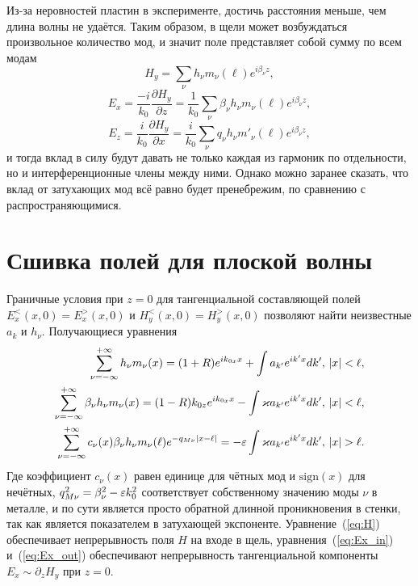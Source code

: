 Из-за неровностей пластин в эксперименте, достичь расстояния меньше, чем длина волны не удаётся. Таким образом, в щели может возбуждаться произвольное количество мод, и значит поле представляет собой сумму по всем модам 
\begin{equation*}
H_y = \sum_{\nu} h_\nu m_\nu(\ell) e^{i \beta_\nu z},
\end{equation*}
\begin{equation*}
E_x = \frac{-i}{k_0}\frac{\partial H_y}{\partial z} = \frac{1}{k_0}\sum_{\nu}\beta_\nu h_\nu m_\nu(\ell) e^{i \beta_\nu z},
\end{equation*}
\begin{equation*}
E_z = \frac{i}{k_0}\frac{\partial H_y}{\partial x} = \frac{i}{k_0}\sum_{\nu} q_\nu h_\nu  m'_\nu(\ell) e^{i \beta_\nu z},
\end{equation*}
и тогда вклад в силу будут давать не только каждая из гармоник по отдельности, но и интерференционные члены между ними. Однако можно заранее сказать, что вклад от затухающих мод всё равно будет пренебрежим, по сравнению с распространяющимися. 
\section{Сшивка полей для плоской волны}

 Граничные условия при $z = 0$ для тангенциальной составляющей полей $E_x^<(x,0) = E_x^>(x,0) $ и $H_y^<(x,0) = H_y^>(x,0)$ 
 позволяют найти неизвестные $a_k$ и $h_\nu$. Получающиеся уравнения
\begin{align}
\sum_{\nu = -\infty}^{+\infty} h_\nu m_\nu (x) = (1+R)e^{ik_{0x}x} 
+ \int a_{k'} e^{ik'x} dk', & \ \abs{x}<\ell, \label{eq:H} \\
\sum_{\nu = -\infty}^{+\infty} \beta_\nu h_\nu m_\nu(x) = (1-R)k_{0z}e^{ik_{0x}x}
- \int \varkappa a_{k'} e^{ik'x} dk', &\ \abs{x}<\ell,  \label{eq:Ex_in} \\
\sum_{\nu = -\infty}^{+\infty} c_\nu(x)\beta_\nu h_\nu m_\nu(\ell) e^{-q_{M\nu}\abs{x-\ell}} = 
 -\eps \int \varkappa a_{k'} e^{ik'x} dk', &\ \abs{x}>\ell. \label{eq:Ex_out}
\end{align}
Где коэффициент $c_\nu(x)$ равен единице для чётных мод и $\text{sign}(x)$ для нечётных, $q_{M\nu}^2 = \beta_\nu^2 - \varepsilon k_0^2$
соответствует собственному значению моды $\nu$ в металле, и по сути является просто обратной длинной проникновения в стенки, так как 
является показателем в затухающей экспоненте. Уравнение~(\ref{eq:H}) обеспечивает непрерывность поля $H$ на входе в щель, 
уравнения~(\ref{eq:Ex_in}) и~(\ref{eq:Ex_out}) обеспечивают непрерывность тангенциальной компоненты $E_x \sim \partial_{z} H_y$ при $z = 0$.

